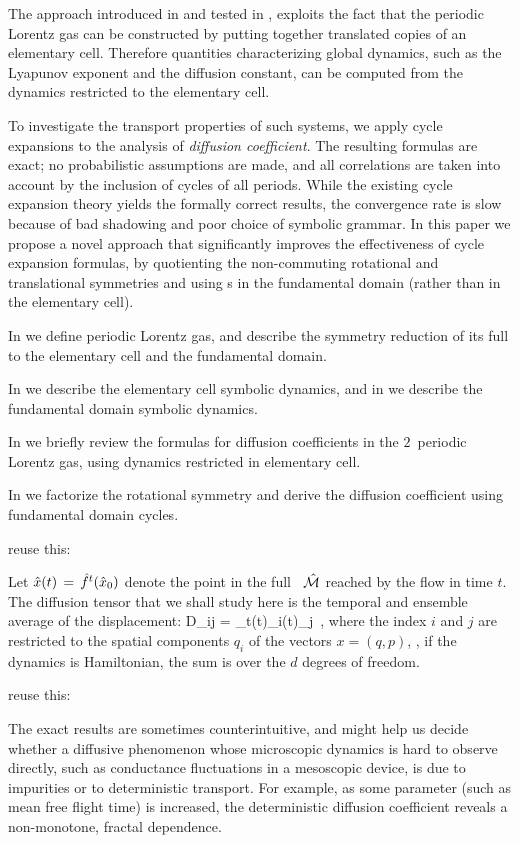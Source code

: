 The approach introduced in  and tested in
, exploits the fact that the periodic Lorentz gas can be
constructed by putting together translated copies of an elementary cell.
Therefore quantities characterizing global dynamics, such as the Lyapunov
exponent and the diffusion constant, can be computed from the dynamics
restricted to the elementary cell.

To investigate the transport properties of such systems, we apply cycle
expansions to the analysis of {\em diffusion coefficient}.
The resulting formulas are exact; no probabilistic assumptions are made,
and all correlations are taken into account by the  inclusion of cycles
of all periods. While the existing cycle expansion theory yields the
formally correct
results, the convergence
rate is slow because of bad shadowing and poor choice of symbolic
grammar. In this paper we propose a novel approach that
significantly improves the effectiveness of cycle expansion formulas, by
quotienting the non-commuting rotational and translational symmetries and
using \po s in the fundamental domain (rather than in the elementary cell).


In  we define periodic Lorentz gas, and describe the
symmetry reduction of its full {\statesp} to the elementary
cell and the fundamental domain.

In  we describe the elementary cell symbolic dynamics,
and in
 we describe the fundamental domain symbolic dynamics.




In 
we briefly review the formulas for diffusion
coefficients in the $2$\dmn\ periodic Lorentz gas, using dynamics
restricted in elementary cell.

In  we
factorize the rotational symmetry and derive the diffusion coefficient
using fundamental domain cycles.

     {
reuse this:

Let $\hat x(t)\,=\,{\hat{f}^{t}(\hat x_0)}$ denote the point in the full
\statesp\ $\hat {{\cal M}}$ reached by the flow in time $t$. The diffusion tensor
that we shall study here
is the temporal and ensemble average of the displacement: \beq D_{ij}
=
\lim_{t\to\infty}\left\langle\hx(t)_i\hx(t)_j\right\rangle
 \,, \label{eq-diff-def} \eeq where the index $i$ and $j$ are
restricted to the spatial components $q_i$ of the {\statesp} vectors
$x=(q,p)$, \ie, if the dynamics is Hamiltonian, the sum is over the
$d$ degrees of freedom.
    }
     {
reuse this:

The exact results are sometimes counterintuitive, and might help us
decide whether a diffusive phenomenon whose microscopic dynamics is hard
to observe directly, such as conductance fluctuations in a mesoscopic
device, is due to impurities or to deterministic transport. For example,
as some parameter (such as mean free flight time) is increased, the
deterministic diffusion coefficient reveals a non-monotone, fractal
dependence.
    }
